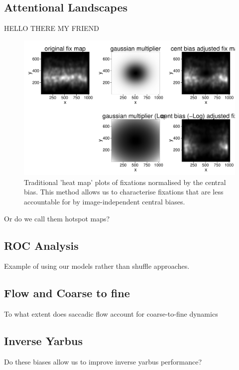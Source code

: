 \documentclass[a4paper, onecolumn, oneside, 11pt]{article}
\begin{document}
\subsection{Attentional Landscapes}

HELLO THERE MY FRIEND

\begin{figure}
\includegraphics[width=\textwidth]{../scripts/heatmaps/centreadjustedheatmaps.pdf}
\caption{Traditional 'heat map' plots of fixations normalised by the central bias. This method allows us to characterise fixations that are less accountable for by image-independent central biases.}
\label{fig:centreAdjustedHeatmaps}
\end{figure}



Or do we call them hotspot maps?

\subsection{ROC Analysis}

Example of using our models rather than shuffle approaches.

\subsection{Flow and Coarse to fine}
To what extent does saccadic flow account for coarse-to-fine dynamics

\subsection{Inverse Yarbus}

Do these biases allow us to improve inverse yarbus performance?
\end{document}
